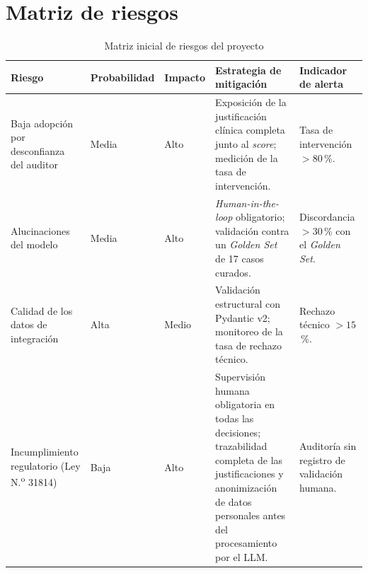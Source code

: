 \section{Matriz de riesgos} 
\begin{table}[H]
    \centering
    \caption{Matriz inicial de riesgos del proyecto}
    \label{tab:matriz-riesgos-inicial}

    \footnotesize
    \setlength{\tabcolsep}{4pt}
    \renewcommand{\arraystretch}{1.15}

    \begin{tabular}{
        p{}
        p{}
        p{}
        p{}
        p{}
    }
        \toprule
        \textbf{Riesgo}
        & \textbf{Probabilidad}
        & \textbf{Impacto}
        & \textbf{Estrategia de mitigación}
        & \textbf{Indicador de alerta} \\
        \midrule

        Baja adopción por desconfianza del auditor
        & Media
        & Alto
        & Exposición de la justificación clínica completa junto al
          \textit{score}; medición de la tasa de intervención.
        & Tasa de intervención $> 80$\,\%. \\

        Alucinaciones del modelo
        & Media
        & Alto
        & \textit{Human-in-the-loop} obligatorio; validación contra
          un \textit{Golden Set} de 17 casos curados.
        & Discordancia $> 30$\,\% con el \textit{Golden Set}. \\

        Calidad de los datos de integración
        & Alta
        & Medio
        & Validación estructural con Pydantic v2; monitoreo de la
          tasa de rechazo técnico.
        & Rechazo técnico $> 15$\,\%. \\

        Incumplimiento regulatorio (Ley N.\textsuperscript{o} 31814)
        & Baja
        & Alto
        & Supervisión humana obligatoria en todas las decisiones;
          trazabilidad completa de las justificaciones y
          anonimización de datos personales antes del procesamiento
          por el LLM.
        & Auditoría sin registro de validación humana. \\

        \bottomrule
    \end{tabular}
\end{table}


\newpage
